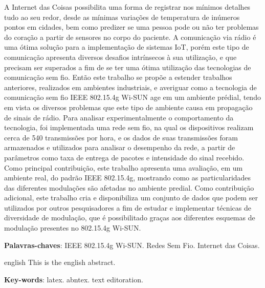 \setlength{\absparsep}{18pt} %
\begin{resumo}
  A Internet das Coisas possibilita uma forma de registrar nos mínimos detalhes tudo ao seu redor, desde as mínimas variações de temperatura de inúmeros pontos em cidades, bem como predizer se uma pessoa pode ou não ter problemas do coração a partir de sensores no corpo do paciente. A comunicação via rádio é uma ótima solução para a implementação de sistemas IoT, porém este tipo de comunicação apresenta diversos desafios intrínsecos à sua utilização, e que precisam ser superados a fim de se ter uma ótima utilização das tecnologias de comunicação sem fio.
  Então este trabalho se propõe a estender trabalhos anteriores, realizados em ambientes industriais, e averiguar como a tecnologia de comunicação sem fio IEEE 802.15.4g Wi-SUN age em um ambiente prédial, tendo em vista os diversos problemas que este tipo de ambiente causa em propagação de sinais de rádio.
  Para analisar experimentalmente o comportamento da tecnologia, foi implementada uma rede sem fio, na qual os dispositivos realizam cerca de 540 transmissões por hora, e os dados de suas transmissões foram armazenados e utilizados para analisar o desempenho da rede, a partir de parâmetros como taxa de entrega de pacotes e intensidade do sinal recebido.
  Como principal contribuição, este trabalho apresenta uma avaliação, em um ambiente real, do padrão IEEE 802.15.4g, mostrando como as particularidades das diferentes modulações são afetadas no ambiente predial.
  Como contribuição adicional, este trabalho cria e disponibiliza um conjunto de dados que podem ser utilizados por outros pesquisadores a fim de estudar e implementar técnicas de diversidade de modulação, que é possibilitado graças aos diferentes esquemas de modulação presentes no 802.15.4g Wi-SUN.


  \textbf{Palavras-chaves}: IEEE 802.15.4g Wi-SUN. Redes Sem Fio. Internet das Coisas.
\end{resumo}

\begin{resumo}[Abstract]
  \begin{otherlanguage*}{english}
    This is the english abstract.

    \vspace{\onelineskip}

    \noindent
    \textbf{Key-words}: latex. abntex. text editoration.
  \end{otherlanguage*}
\end{resumo}

